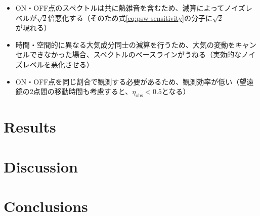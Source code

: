 \documentclass[a4paper,10pt,oneside,twocolumn,notitlepage,final]{jarticle}
\newcommand{\subrm}[1]{_{\mathrm{#1}}}
\begin{document}
\begin{itemize}
    \item ON・OFF点のスペクトルは共に熱雑音を含むため、減算によってノイズレベルが$\sqrt{2}$倍悪化する（そのため式\ref{eq:psw-sensitivity}の分子に$\sqrt{2}$が現れる）
    \item 時間・空間的に異なる大気成分同士の減算を行うため、大気の変動をキャンセルできなかった場合、スペクトルのベースラインがうねる（実効的なノイズレベルを悪化させる）
    \item ON・OFF点を同じ割合で観測する必要があるため、観測効率が低い（望遠鏡の2点間の移動時間も考慮すると、$\eta\subrm{obs}<0.5$となる）
\end{itemize}

\section{Results}
\label{s:results}


\section{Discussion}
\label{s:discussion}


\section{Conclusions}

\small
\begin{thebibliography}{99}
\end{thebibliography}
\end{document}
